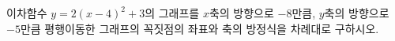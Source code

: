 이차함수 $y=2(x-4)^2+3$의 그래프를 $x$축의 방향으로 $-8$만큼, $y$축의 방향으로 $-5$만큼 평행이동한 그래프의 꼭짓점의 좌표와 축의 방정식을 차례대로 구하시오.
